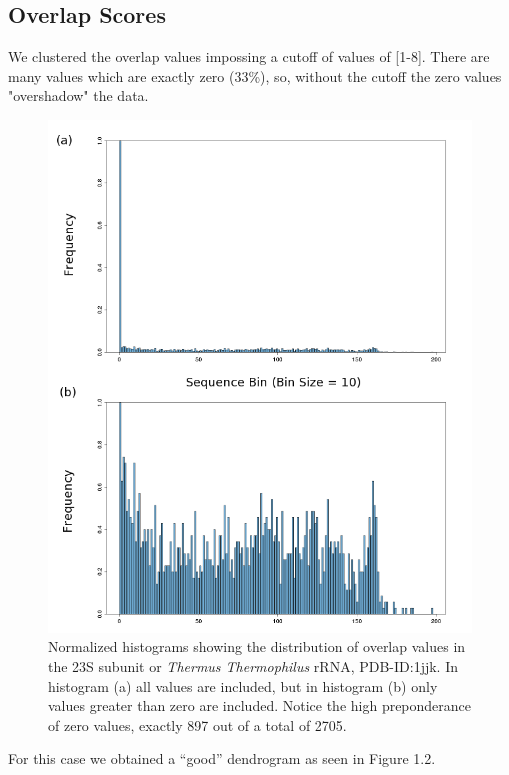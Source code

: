 \documentclass[10pt, oneside, pdftex]{article}
\begin{document}
\subsection{Overlap Scores} 
We clustered the overlap values impossing a cutoff of values
of [1-8]. There are many values which are exactly zero (33\%), so,
without the cutoff the zero values "overshadow" the data.
\begin{figure}[htbp]
\centering 
\includegraphics[angle=0, scale=0.8]{histocompare.png}
\caption{Normalized histograms showing the distribution of overlap values in 
the 23S subunit or \textit{Thermus Thermophilus} rRNA, PDB-ID:1jjk. In histogram 
(a) all values are included, but in histogram (b) only values greater than zero are 
included. Notice the high preponderance of zero values, exactly 897 out of a total
of 2705.}
\end{figure}
For this case we obtained a ``good'' dendrogram as seen in Figure 1.2.
\end{document}
